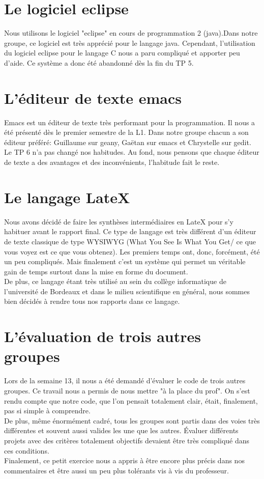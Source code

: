 \documentclass{report}
\begin{document}
\section{Le logiciel eclipse}
Nous utilisons le logiciel "eclipse" en cours de programmation 2 (java).Dans notre groupe, ce logiciel est très apprécié pour le langage java. Cependant, l'utilisation du logiciel eclipse pour le langage C nous a paru compliqué et apporter peu d'aide. Ce système a donc été abandonné dès la fin du TP 5.
\section{L'éditeur de texte emacs}
Emacs est un éditeur de texte très performant pour la programmation. Il nous a été présenté dès le premier semestre de la L1. Dans notre groupe chacun a son éditeur préféré: Guillaume sur geany, Gaëtan sur emacs et Chrystelle sur gedit. Le TP 6 n'a pas changé nos habitudes. Au fond, nous pensons que chaque éditeur de texte a des avantages et des inconvénients, l'habitude fait le reste.
\section{Le langage LateX}
Nous avons décidé de faire les synthèses intermédiaires en LateX pour s'y habituer avant le rapport final. Ce type de langage est très différent d'un éditeur de texte classique de type WYSIWYG (What You See Is What You Get/ ce que vous voyez est ce que vous obtenez). Les premiers temps ont, donc, forcément, été un peu compliqués. Mais finalement c'est un système qui permet un véritable gain de temps surtout dans la mise en forme du document.\\
De plus, ce langage étant très utilisé au sein du collège informatique de l'université de Bordeaux et dans le milieu scientifique en général, nous sommes bien décidés à rendre tous nos rapports dans ce langage.
\section{L'évaluation de trois autres groupes}
Lors de la semaine 13, il nous a été demandé d'évaluer le code de trois autres groupes. Ce travail nous a permis de nous mettre "à la place du prof". On s'est rendu compte que notre code, que l'on pensait totalement clair, était, finalement, pas si simple à comprendre.\\ De plus, même énormément cadré, tous les groupes sont partis dans des voies très différentes et souvent aussi valides les une que les autres. Évaluer différents projets avec des critères totalement objectifs devaient être très compliqué dans ces conditions.\\ Finalement, ce petit exercice nous a appris à être encore plus précis dans nos commentaires et être aussi un peu plus tolérants vis à vis du professeur.
\end{document}
